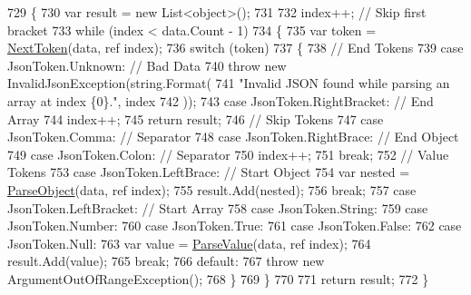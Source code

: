 \begin{DoxyCode}
729         \{
730             var result = \textcolor{keyword}{new} List<object>();
731 
732             index++; \textcolor{comment}{// Skip first bracket}
733             \textcolor{keywordflow}{while} (index < data.Count - 1)
734             \{
735                 var token = \hyperlink{a00060_a1d2daab9b052b186da7a2b6711be5803}{NextToken}(data, ref index);
736                 \textcolor{keywordflow}{switch} (token)
737                 \{
738                     \textcolor{comment}{// End Tokens}
739                     \textcolor{keywordflow}{case} JsonToken.Unknown:             \textcolor{comment}{// Bad Data}
740                         \textcolor{keywordflow}{throw} \textcolor{keyword}{new} InvalidJsonException(\textcolor{keywordtype}{string}.Format(
741                             \textcolor{stringliteral}{"Invalid JSON found while parsing an array at index \{0\}."}, index
742                             ));
743                     \textcolor{keywordflow}{case} JsonToken.RightBracket:        \textcolor{comment}{// End Array}
744                         index++;
745                         \textcolor{keywordflow}{return} result;
746                     \textcolor{comment}{// Skip Tokens}
747                     \textcolor{keywordflow}{case} JsonToken.Comma:               \textcolor{comment}{// Separator}
748                     \textcolor{keywordflow}{case} JsonToken.RightBrace:          \textcolor{comment}{// End Object}
749                     \textcolor{keywordflow}{case} JsonToken.Colon:               \textcolor{comment}{// Separator}
750                         index++;
751                         \textcolor{keywordflow}{break};
752                     \textcolor{comment}{// Value Tokens}
753                     \textcolor{keywordflow}{case} JsonToken.LeftBrace:           \textcolor{comment}{// Start Object}
754                         var nested = \hyperlink{a00060_a49577a43cf31e147b6d46ea28f7f617e}{ParseObject}(data, ref index);
755                         result.Add(nested);
756                         \textcolor{keywordflow}{break};
757                     \textcolor{keywordflow}{case} JsonToken.LeftBracket:         \textcolor{comment}{// Start Array}
758                     \textcolor{keywordflow}{case} JsonToken.String:
759                     \textcolor{keywordflow}{case} JsonToken.Number:
760                     \textcolor{keywordflow}{case} JsonToken.True:
761                     \textcolor{keywordflow}{case} JsonToken.False:
762                     \textcolor{keywordflow}{case} JsonToken.Null:
763                         var value = \hyperlink{a00060_aa84c3b3d395c5990f202ef55321dfa1a}{ParseValue}(data, ref index);
764                         result.Add(value);
765                         \textcolor{keywordflow}{break};
766                     \textcolor{keywordflow}{default}:
767                         \textcolor{keywordflow}{throw} \textcolor{keyword}{new} ArgumentOutOfRangeException();
768                 \}
769             \}
770 
771             \textcolor{keywordflow}{return} result;
772         \}
\end{DoxyCode}

